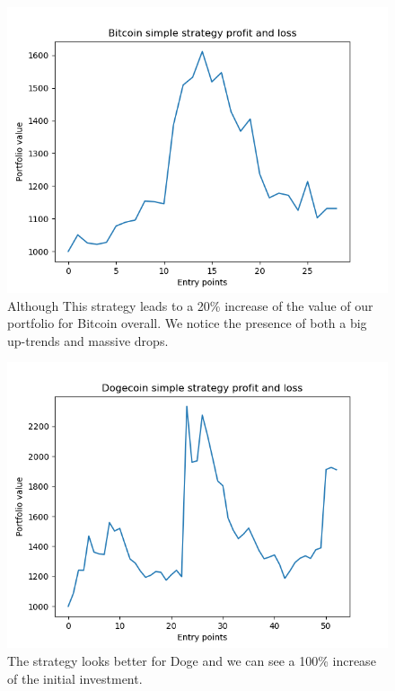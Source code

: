 \documentclass[twoside]{report}
\begin{document}
\begin{spacing}{1}
\begin{figure}[!htbp]
    \centering
    \includegraphics[scale = 0.5]{TestPlots/plot-BTC-pnl.png}
    \caption{Although This strategy leads to a 20\% increase of the value of our portfolio for Bitcoin overall. We notice the presence of both a big up-trends and massive drops.}
    \label{}
\end{figure}

\begin{figure}[!htbp]
    \centering
    \includegraphics[scale = 0.5]{TestPlots/plot-DOGE-pnl.png}
    \caption{The strategy looks better for Doge and we can see a 100\% increase of the initial investment.}
    \label{}
\end{figure}


\end{spacing}
\end{document}
